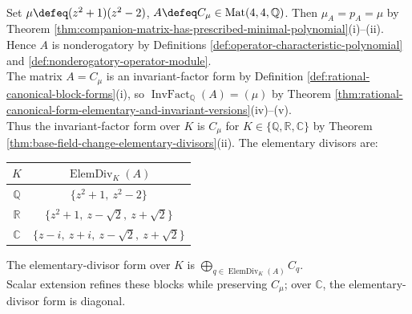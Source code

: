 \begin{example} \label{ex:base-field-rational-canonical-form-minimal-polynomial} \\
Set $\mu\defeq(z^2+1)(z^2-2)$, $A\defeq C_{\mu}\in\operatorname{Mat}(4,4,\mathbb{Q})$. Then $\mu_A=p_A=\mu$ by Theorem \ref{thm:companion-matrix-has-prescribed-minimal-polynomial}(i)--(ii).\\
Hence $A$ is nonderogatory by Definitions \ref{def:operator-characteristic-polynomial} and \ref{def:nonderogatory-operator-module}.\\
The matrix $A=C_\mu$ is an invariant-factor form by Definition \ref{def:rational-canonical-block-forms}(i), so $\operatorname{InvFact}_{\mathbb{Q}}(A)=(\mu)$ by Theorem \ref{thm:rational-canonical-form-elementary-and-invariant-versions}(iv)--(v).\\
Thus the invariant-factor form over $K$ is $C_\mu$ for $K\in\{\mathbb{Q},\mathbb{R},\mathbb{C}\}$ by Theorem \ref{thm:base-field-change-elementary-divisors}(ii). The elementary divisors are:
\begin{center}
\begin{tabular}{c|c}
$K$ & $\operatorname{ElemDiv}_K(A)$\\
\hline
$\mathbb{Q}$ & $\{z^2+1,\ z^2-2\}$\\
$\mathbb{R}$ & $\{z^2+1,\ z-\sqrt{2},\ z+\sqrt{2}\}$\\
$\mathbb{C}$ & $\{z-i,\ z+i,\ z-\sqrt{2},\ z+\sqrt{2}\}$
\end{tabular}
\end{center}
The elementary-divisor form over $K$ is $\bigoplus\limits_{q\in\operatorname{ElemDiv}_K(A)}C_q$.\\
Scalar extension refines these blocks while preserving $C_\mu$; over $\mathbb{C}$, the elementary-divisor form is diagonal.
\end{example}

